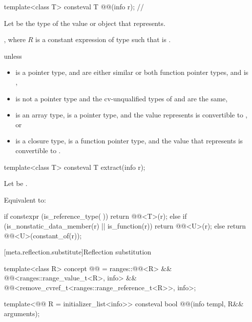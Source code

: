 \begin{itemdecl}
template<class T>
  consteval T @@(info r);    // \expos
\end{itemdecl}

\begin{itemdescr}
\pnum
Let  be the type of the value or object that  represents.

\pnum
\returns
{},
where $R$ is a constant expression of type 
such that  is .

\pnum
\throws
{} unless
\begin{itemize}
\item
   is a pointer type,
   and  are either similar
  or both function pointer types, and
   is ,
\item
   is not a pointer type
  and the cv-unqualified types of  and  are the same,
\item
   is an array type,
   is a pointer type, and
  the value  represents is convertible to , or
\item
   is a closure type,
   is a function pointer type, and
  the value that  represents is convertible to .
\end{itemize}
\end{itemdescr}

%
\begin{itemdecl}
template<class T>
  consteval T extract(info r);
\end{itemdecl}

\begin{itemdescr}
\pnum
Let  be .

\pnum
\effects
Equivalent to:
\begin{codeblock}
if constexpr (is_reference_type(^^T)) {
  return @@<T>(r);
} else if (is_nonstatic_data_member(r) || is_function(r)) {
  return @@<U>(r);
} else {
  return @@<U>(constant_of(r));
}
\end{codeblock}
\end{itemdescr}

[meta.reflection.substitute]{Reflection substitution}

\begin{itemdecl}
template<class R>
concept @@ =
  ranges::@@<R> &&
  @@<ranges::range_value_t<R>, info> &&
  @@<remove_cvref_t<ranges::range_reference_t<R>>, info>;

template<@@ R = initializer_list<info>>
  consteval bool @@(info templ, R&& arguments);
\end{itemdecl}

